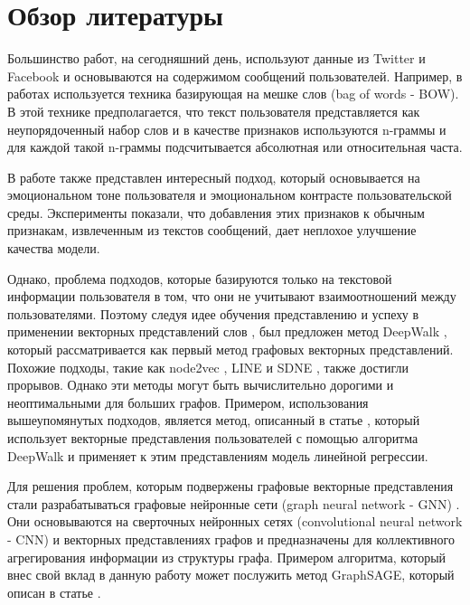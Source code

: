 \section{Обзор литературы}

Большинство работ, на сегодняшний день, используют данные из Twitter и Facebook и основываются на содержимом сообщений пользователей. Например, в работах \cite{Learning multiview embeddings of twitter users, Developing age and gender predictive lexica over social media, Cross-platform differences in self-disclosure and trait prediction} используется техника базирующая на мешке слов (bag of words - BOW). В этой технике предполагается, что текст пользователя представляется как неупорядоченный набор слов и в качестве признаков используются n-граммы и для каждой такой n-граммы подсчитывается абсолютная или относительная часта. 

В работе \cite{Inferring perceived demographics from user emotional tone and user-environment emotional contrast} также представлен интересный подход, который основывается на эмоциональном тоне пользователя и эмоциональном контрасте пользовательской среды. Эксперименты показали, что добавления этих признаков к обычным признакам, извлеченным из текстов сообщений, дает неплохое улучшение качества модели.

Однако, проблема подходов, которые базируются только на текстовой информации пользователя в том, что они не учитывают взаимоотношений между пользователями. Поэтому следуя идее обучения представлению и успеху  в применении векторных представлений слов \cite{Efficient estimation of word representations in vector space}, был предложен метод DeepWalk \cite{DeepWalk}, который рассматривается как первый метод графовых векторных представлений. Похожие подходы, такие как node2vec \cite{Node2Vec}, LINE  \cite{LINE} и SDNE \cite{SDNE}, также достигли прорывов. Однако эти методы могут быть вычислительно дорогими и неоптимальными для больших графов. Примером, использования вышеупомянутых подходов, является метод, описанный в статье \cite{Exact age prediction in social networks}, который использует векторные представления пользователей с помощью алгоритма DeepWalk  и применяет к этим представлениям модель линейной регрессии. 

Для решения проблем, которым подвержены графовые векторные представления стали разрабатываться графовые нейронные сети (graph neural network - GNN) \cite{Graph neural networks: A review of methods and applications}. Они основываются на сверточных нейронных сетях (convolutional neural network - CNN) и векторных представлениях графов и предназначены для коллективного агрегирования информации из структуры графа. Примером алгоритма, который внес свой вклад в данную работу может послужить метод GraphSAGE, который описан в статье \cite{GraphSAGE}.






\clearpage